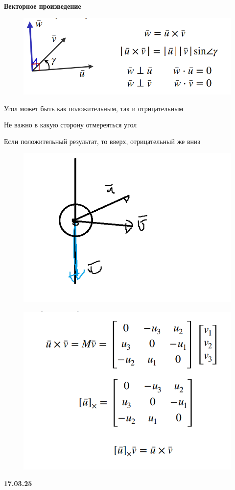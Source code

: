 \documentclass{article}
\begin{document}
\textbf{Векторное произведение}
\begin{figure} [H]
    \includegraphics[width=0.50\linewidth]{Снимок экрана 2025-03-10 131820.png}
\end{figure}


Угол может быть как положительным, так и отрицательным

Не важно в какую сторону отмереяться угол

Если положительный результат, то вверх, 
отрицательный же вниз

\begin{figure} [H]
    \includegraphics[width=0.50\linewidth]{11.png}
\end{figure}




\begin{figure} [H]
    \includegraphics[width=0.50\linewidth]{Снимок экрана 2025-03-10 133749.png}
\end{figure}



\textbf{17.03.25}
\end{document}
